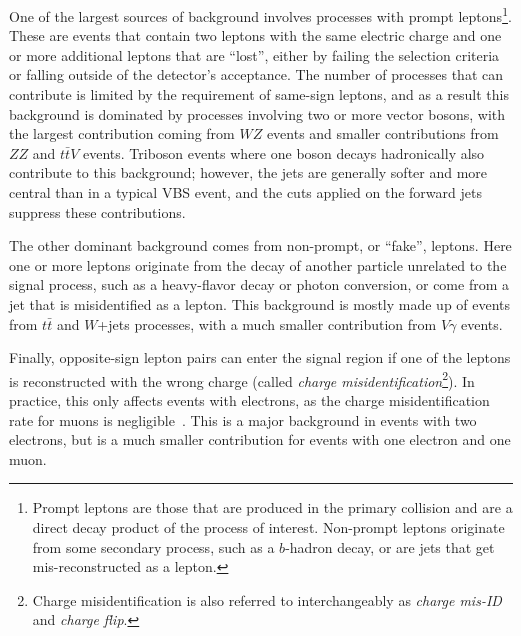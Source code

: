 One of the largest sources of background involves processes with prompt leptons\footnote{Prompt leptons are those that are produced in the primary collision and are a direct decay product of the process of interest.  Non-prompt leptons originate from some secondary process, such as a $b$-hadron decay, or are jets that get mis-reconstructed as a lepton.}.
These are events that contain two leptons with the same electric charge and one or more additional leptons that are ``lost'', either by failing the selection criteria or falling outside of the detector's acceptance.
The number of processes that can contribute is limited by the requirement of same-sign leptons, and as a result this background is dominated by processes involving two or more vector bosons, with the largest contribution coming from $WZ$ events and smaller contributions from $ZZ$ and $t\bar{t}V$ events.
Triboson events where one boson decays hadronically also contribute to this background; however, the jets are generally softer and more central than in a typical VBS event, and the cuts applied on the forward jets suppress these contributions.

The other dominant background comes from non-prompt, or ``fake'', leptons.
Here one or more leptons originate from the decay of another particle unrelated to the signal process, such as a heavy-flavor decay or photon conversion, or come from a jet that is misidentified as a lepton.
This background is mostly made up of events from $t\bar{t}$ and $W$+jets processes, with a much smaller contribution from $V\gamma$ events. 

Finally, opposite-sign lepton pairs can enter the signal region if one of the leptons is reconstructed with the wrong charge (called \emph{charge misidentification}\footnote{Charge misidentification is also referred to interchangeably as \emph{charge mis-ID} and \emph{charge flip}.}).
In practice, this only affects events with electrons, as the charge misidentification rate for muons is negligible~\cite{2013.muon-flip}.
This is a major background in events with two electrons, but is a much smaller contribution for events with one electron and one muon.

%
